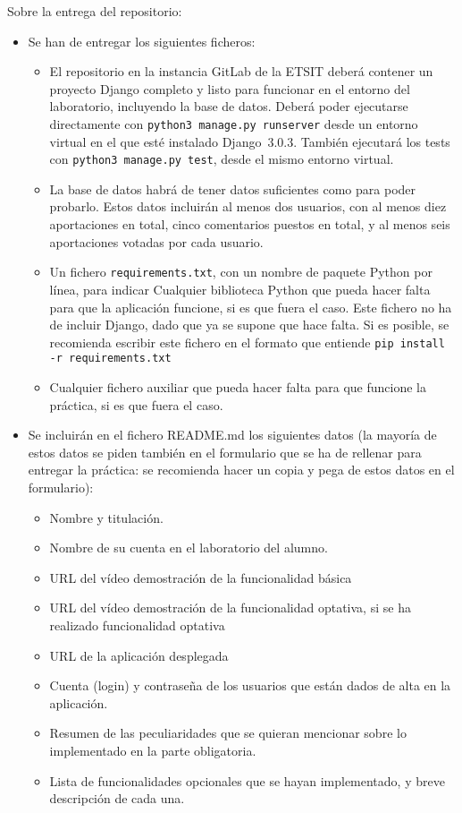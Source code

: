Sobre la entrega del repositorio:
\begin{itemize}
  \item Se han de entregar los siguientes ficheros:

\begin{itemize}
  \item El repositorio en la instancia GitLab de la ETSIT deberá contener un proyecto Django completo y listo para funcionar en el entorno del laboratorio, incluyendo la base de datos. Deberá poder ejecutarse directamente con \verb|python3 manage.py runserver| desde un entorno virtual en el que esté instalado Django~3.0.3. También ejecutará los tests con \verb|python3 manage.py test|, desde el mismo entorno virtual.

  \item La base de datos habrá de tener datos suficientes como para poder probarlo. Estos datos incluirán al menos dos usuarios, con al menos diez aportaciones en total, cinco comentarios puestos en total, y al menos seis aportaciones votadas por cada usuario.

  \item Un fichero \verb|requirements.txt|, con un nombre de paquete Python por línea, para indicar Cualquier biblioteca Python que pueda hacer falta para que la aplicación funcione, si es que fuera el caso. Este fichero no ha de incluir Django, dado que ya se supone que hace falta. Si es posible, se recomienda escribir este fichero en el formato que entiende \verb|pip install -r requirements.txt|

  \item Cualquier fichero auxiliar que pueda hacer falta para que funcione la práctica, si es que fuera el caso.
\end{itemize}

  \item Se incluirán en el fichero README.md los siguientes datos (la mayoría de estos datos se piden también en el formulario que se ha de rellenar para entregar la práctica: se recomienda hacer un copia y pega de estos datos en el formulario):

\begin{itemize}
  \item Nombre y titulación.
  \item Nombre de su cuenta en el laboratorio del alumno.
  \item URL del vídeo demostración de la funcionalidad básica
  \item URL del vídeo demostración de la funcionalidad optativa, si se ha realizado funcionalidad optativa
  \item URL de la aplicación desplegada
  \item Cuenta (login) y contraseña de los usuarios que están dados de alta en la aplicación.
  \item Resumen de las peculiaridades que se quieran mencionar sobre lo implementado en la parte obligatoria.
  \item Lista de funcionalidades opcionales que se hayan implementado, y breve descripción de cada una.
\end{itemize}


\end{itemize}
